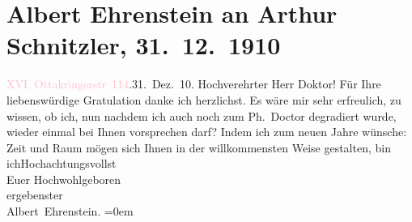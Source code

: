 

               \section[Albert Ehrenstein an Arthur Schnitzler, 31. 12. 1910]{ Albert Ehrenstein an Arthur Schnitzler, 31. 12. 1910}\nopagebreak{}\rehead{ }\normalsize\beginnumbering{} \toendnotes[C]{\smallbreak\pagebreak[2]} 
\pstart
           {\pb}\textcolor{pink}{XVI. Ottakringerstr 114}{}\ledrightnote{\textcolor{pink}{Ottakringerstraße}}.\hfill 31. Dez. 10.\pend
           \pstart\center{}Hochverehrter Herr Doktor!\pend\pstart
           Für Ihre liebenswürdige Gratulation danke ich herzlichst.\pend
           \pstart
           Es wäre mir sehr erfreulich, zu wissen, ob ich, nun nachdem ich auch noch zum
                    Ph. Doctor degradiert wurde, wieder einmal bei Ihnen vorsprechen darf?\pend
           \pstart
           Indem ich zum neuen Jahre wünsche: Zeit und Raum mögen sich Ihnen in der
                    willkommensten Weise gestalten,\pend
           \pstart
           bin ich\hspace*{2em}Hochachtungsvollst{\\[\baselineskip]}Euer Hochwohlgeboren{\\[\baselineskip]}ergebenster{\\[\baselineskip]}\spacefill\mbox{Albert Ehrenstein.}\pend
           \leftskip=0em{}\endnumbering{}  
      